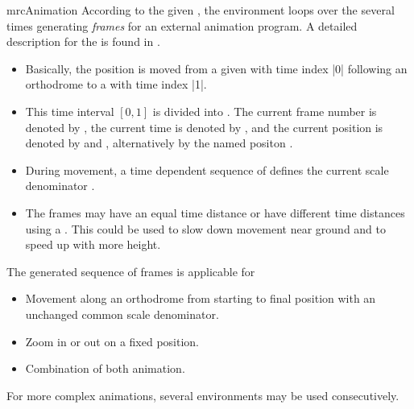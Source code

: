 \begin{docEnvironment}[doc new=2024-07-31]{mrcAnimation}{}
  According to the given , the environment loops over the
   several times generating \textit{frames}
  for an external animation program.
  A detailed description for the  is found in .
  \begin{itemize}
  \item Basically, the position is moved from
    a given  with time index |0|
    following an orthodrome
    to a  with time index |1|.
  \item
    This time interval $[0,1]$ is divided into .
    The current frame number is denoted by ,
    the current time is denoted by  , and
    the current position is denoted by
     and ,
    alternatively by the named positon .
  \item
    During movement, a time dependent sequence of 
    defines the current scale denominator .
  \item
    The frames may have an equal time distance or have different time
    distances using a . This could be used
    to slow down movement near ground and to speed up with more height.
  \end{itemize}
  The generated sequence of frames is applicable for
  \begin{itemize}
  \item Movement along an orthodrome from starting to final position with an unchanged
    common scale denominator.
  \item Zoom in or out on a fixed position.
  \item Combination of both animation.
  \end{itemize}
  For more complex animations, several  environments may be
  used consecutively.
\end{docEnvironment}

